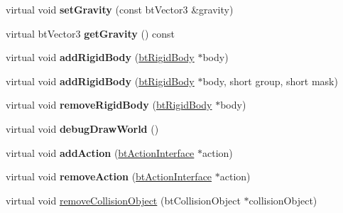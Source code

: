 \begin{DoxyCompactItemize}
\mbox{\label{classbtSimpleDynamicsWorld_a2a3a3af7c48d2482ac0e4416d495f3bd}} 
virtual void {\bfseries set\+Gravity} (const bt\+Vector3 \&gravity)
\item 
\mbox{\label{classbtSimpleDynamicsWorld_a5b4f4914439ed445d4fc4c5cf54b349f}} 
virtual bt\+Vector3 {\bfseries get\+Gravity} () const
\item 
\mbox{\label{classbtSimpleDynamicsWorld_aa43f15ae56d486aa2feef5247d487836}} 
virtual void {\bfseries add\+Rigid\+Body} (\hyperlink{classbtRigidBody}{bt\+Rigid\+Body} $\ast$body)
\item 
\mbox{\label{classbtSimpleDynamicsWorld_a1fcb6385c3dfbe431d5311818459f3d2}} 
virtual void {\bfseries add\+Rigid\+Body} (\hyperlink{classbtRigidBody}{bt\+Rigid\+Body} $\ast$body, short group, short mask)
\item 
\mbox{\label{classbtSimpleDynamicsWorld_ac88bbb6185baf00c30b0b395b9d3a634}} 
virtual void {\bfseries remove\+Rigid\+Body} (\hyperlink{classbtRigidBody}{bt\+Rigid\+Body} $\ast$body)
\item 
\mbox{\label{classbtSimpleDynamicsWorld_a6a09dadde946550a2bb00863a0c84710}} 
virtual void {\bfseries debug\+Draw\+World} ()
\item 
\mbox{\label{classbtSimpleDynamicsWorld_a1c5b36a0411fa632c5ca9dc53d60a266}} 
virtual void {\bfseries add\+Action} (\hyperlink{classbtActionInterface}{bt\+Action\+Interface} $\ast$action)
\item 
\mbox{\label{classbtSimpleDynamicsWorld_a7e23fc8e9750c50dd320819f82156d78}} 
virtual void {\bfseries remove\+Action} (\hyperlink{classbtActionInterface}{bt\+Action\+Interface} $\ast$action)
\item 
\mbox{\label{classbtSimpleDynamicsWorld_af3f261b709a717508a82b3e6fb482f28}} 
virtual void \hyperlink{classbtSimpleDynamicsWorld_af3f261b709a717508a82b3e6fb482f28}{remove\+Collision\+Object} (bt\+Collision\+Object $\ast$collision\+Object)

\end{DoxyCompactItemize}
